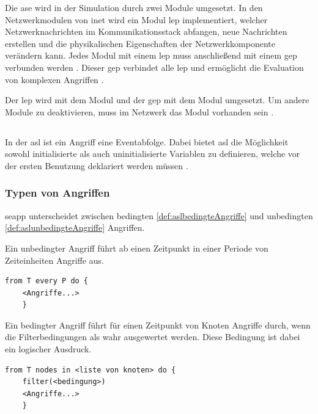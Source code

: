 Die \acrshort{ase} wird in der Simulation durch zwei Module umgesetzt. In den Netzwerkmodulen von \gls{inet} wird ein Modul \gls{lep} implementiert, welcher Netzwerknachrichten im Kommunikationsstack abfangen, neue Nachrichten erstellen und die physikalischen Eigenschaften der Netzwerkkomponente verändern kann. \cite[]{Tiloca2019} Jedes Modul mit einem \gls{lep} muss anschließend mit einem \gls{gep} verbunden werden \cite[]{SEAManual}. Dieser \gls{gep} verbindet alle \gls{lep} und ermöglicht die Evaluation von komplexen Angriffen \cite[]{Tiloca2019}. 

Der \gls{lep} wird mit dem Modul  und der \gls{gep} mit dem Modul  umgesetzt. Um andere Module zu deaktivieren, muss im Netzwerk das Modul  vorhanden sein \cite[]{SEAManual}.

\subsection{}
In der \gls{asl} ist ein Angriff eine Eventabfolge. Dabei bietet \gls{asl} die Möglichkeit sowohl initialisierte als auch uninitialisierte Variablen zu definieren, welche vor der ersten Benutzung deklariert werden müssen  \cite[]{SEAManual}. 

\subsubsection{Typen von Angriffen}
\gls{seapp} unterscheidet zwischen bedingten \ref{def:aslbedingteAngriffe} und unbedingten \ref{def:aslunbedingteAngriffe} Angriffen.
\begin{definition}\label{def:aslunbedingteAngriffe}
	Ein unbedingter Angriff \cite[]{Tiloca2019} führt ab einen Zeitpunkt  in einer Periode von  Zeiteinheiten Angriffe aus.
	\begin{lstlisting}[language=ADL]
	from T every P do {
	<Angriffe...>
	}
	\end{lstlisting}
\end{definition}

\begin{definition}\label{def:aslbedingteAngriffe}
	Ein bedingter Angriff \cite[]{Tiloca2019} führt für einen Zeitpunkt  von Knoten  Angriffe durch, wenn die Filterbedingungen  als wahr ausgewertet werden. Diese Bedingung ist dabei ein logischer Ausdruck.
	\begin{lstlisting}[language=ADL]
	from T nodes in <liste von knoten> do {
	filter(<bedingung>)
	<Angriffe...>
	}
	\end{lstlisting}
\end{definition}

